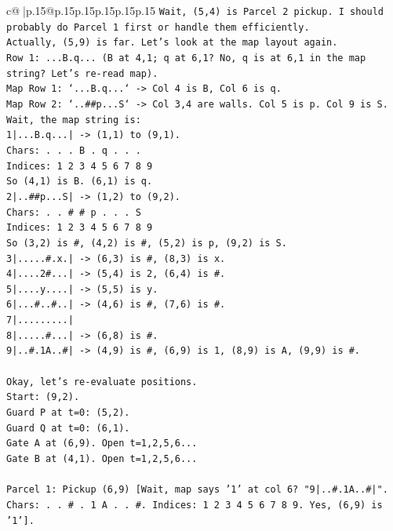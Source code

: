 \documentclass{article}
\begin{document}
{\begin{supertabular}{c@{$\;$}|p{.15\linewidth}@{}p{.15\linewidth}p{.15\linewidth}p{.15\linewidth}p{.15\linewidth}p{.15\linewidth}}
{{{\texttt{Wait, (5,4) is Parcel 2 pickup. I should probably do Parcel 1 first or handle them efficiently.} \\
\texttt{Actually, (5,9) is far. Let's look at the map layout again.} \\
\texttt{Row 1: ...B.q... (B at 4,1; q at 6,1? No, q is at 6,1 in the map string? Let's re{-}read map).} \\
\texttt{Map Row 1: `...B.q...` {-}> Col 4 is B, Col 6 is q.} \\
\texttt{Map Row 2: `..\#\#p...S` {-}> Col 3,4 are walls. Col 5 is p. Col 9 is S.} \\
\texttt{Wait, the map string is:} \\
\texttt{1|...B.q...| {-}> (1,1) to (9,1).} \\
\texttt{Chars: . . . B . q . . .} \\
\texttt{Indices: 1 2 3 4 5 6 7 8 9} \\
\texttt{So (4,1) is B. (6,1) is q.} \\
\texttt{2|..\#\#p...S| {-}> (1,2) to (9,2).} \\
\texttt{Chars: . . \# \# p . . . S} \\
\texttt{Indices: 1 2 3 4 5 6 7 8 9} \\
\texttt{So (3,2) is \#, (4,2) is \#, (5,2) is p, (9,2) is S.} \\
\texttt{3|.....\#.x.| {-}> (6,3) is \#, (8,3) is x.} \\
\texttt{4|....2\#...| {-}> (5,4) is 2, (6,4) is \#.} \\
\texttt{5|....y....| {-}> (5,5) is y.} \\
\texttt{6|...\#..\#..| {-}> (4,6) is \#, (7,6) is \#.} \\
\texttt{7|.........|} \\
\texttt{8|.....\#...| {-}> (6,8) is \#.} \\
\texttt{9|..\#.1A..\#| {-}> (4,9) is \#, (6,9) is 1, (8,9) is A, (9,9) is \#.} \\
\\ 
\texttt{Okay, let's re{-}evaluate positions.} \\
\texttt{Start: (9,2).} \\
\texttt{Guard P at t=0: (5,2).} \\
\texttt{Guard Q at t=0: (6,1).} \\
\texttt{Gate A at (6,9). Open t=1,2,5,6...} \\
\texttt{Gate B at (4,1). Open t=1,2,5,6...} \\
\\ 
\texttt{Parcel 1: Pickup (6,9) {[}Wait, map says '1' at col 6? "9|..\#.1A..\#|". Chars: . . \# . 1 A . . \#. Indices: 1 2 3 4 5 6 7 8 9. Yes, (6,9) is '1'{]}.} \\
}}}
\end{supertabular}}
\end{document}
